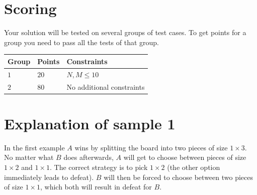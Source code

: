 \section*{Scoring}
Your solution will be tested on several groups of test cases. To get points for a group you need to pass all the tests of that group.

\noindent
\begin{tabular}{| l | l | l |}
	\hline
	Group & Points & Constraints\\ \hline
 $1$    & $20$        & $N, M \le 10$ \\ \hline
 $2$    & $80$        & No additional constraints \\ \hline
\end{tabular}

\section*{Explanation of sample 1}
In the first example $A$ wins by splitting the board into two pieces of size $1 \times 3$.
No matter what $B$ does afterwards, $A$ will get to choose between pieces of size $1 \times 2$
and $1 \times 1$. The correct strategy is to pick $1 \times 2$ (the other option immediately leads
to defeat). $B$ will then be forced to choose between two pieces of size $1 \times 1$, which both
will result in defeat for $B$.
